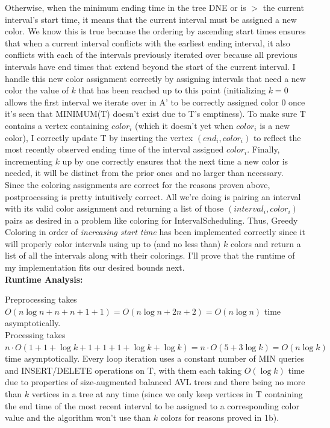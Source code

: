 \documentclass[11pt]{article}
\begin{document}
\begin{enumerate}
\begin{enumerate}
Otherwise, when the minimum ending time in the tree DNE or is $>$ the current interval's start time, it means that the current interval must be assigned a new color. We know this is true because the ordering by ascending start times ensures that when a current interval conflicts with the earliest ending interval, it also conflicts with each of the intervals previously iterated over because all previous intervals have end times that extend beyond the start of the current interval. I handle this new color assignment correctly by assigning intervals that need a new color the value of $k$ that has been reached up to this point (initializing $k = 0$ allows the first interval we iterate over in A' to be correctly assigned color 0 once it's seen that MINIMUM(T) doesn't exist due to T's emptiness). To make sure T contains a vertex containing $color_i$ (which it doesn't yet when $color_i$ is a new color), I correctly update T by inserting the vertex $(end_i, color_i)$ to reflect the most recently observed ending time of the interval assigned $color_i$. Finally, incrementing $k$ up by one correctly ensures that the next time a new color is needed, it will be distinct from the prior ones and no larger than necessary. \\

Since the coloring assignments are correct for the reasons proven above, postprocessing is pretty intuitively correct. All we're doing is pairing an interval with its valid color assignment and returning a list of those $(interval_i, color_i)$ pairs as desired in a problem like coloring for IntervalScheduling. Thus, Greedy Coloring in order of \textit{increasing start time} has been implemented correctly since it will properly color intervals using up to (and no less than) $k$ colors and return a list of all the intervals along with their colorings. I'll prove that the runtime of my implementation fits our desired bounds next. \\

\textbf{Runtime Analysis:}

Preprocessing takes $O(n \log n + n + n + 1 + 1) = O(n \log n + 2n + 2) = O(n \log n)$ time asymptotically. \\

Processing takes $n \cdot O(1 + 1 + \log{k} + 1 + 1 + 1 + \log{k} + \log{k}) = n \cdot O(5 + 3 \log{k}) = O(n \log{k})$ time asymptotically. Every loop iteration uses a constant number of MIN queries and INSERT/DELETE operations on T, with them each taking $O(\log k)$ time due to properties of size-augmented balanced AVL trees and there being no more than $k$ vertices in a tree at any time (since we only keep vertices in T containing the end time of the most recent interval to be assigned to a corresponding color value and the algorithm won't use than $k$ colors for reasons proved in 1b). \\


\end{enumerate}
\end{enumerate}
\end{document}
